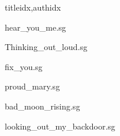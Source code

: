 \documentclass[
    ]{article}
\begin{document}

\begin{songs}{titleidx,authidx}

{hear_you_me.sg}


{Thinking_out_loud.sg}


{fix_you.sg}


{proud_mary.sg}


{bad_moon_rising.sg}


{looking_out_my_backdoor.sg}

\end{songs}

\end{document}
